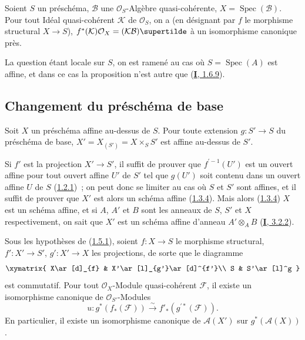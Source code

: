 \begin{proposition}[1.4.11]
\label{II.1.4.11-fr}
Soient $S$ un préschéma, $\mathcal{B}$ une $\mathcal{O}_S$-Algèbre
quasi-cohérente, $X=\operatorname{Spec}(\mathcal{B})$. Pour tout Idéal
quasi-cohérent $\mathcal{K}$ de $\mathcal{O}_S$, on a (en désignant par $f$
le morphisme structural $X\to S$),
$f^*(\mathcal{K})\mathcal{O}_X=(\mathcal{K}\mathcal{B})\supertilde$ à un
isomorphisme canonique près.
\end{proposition}

La question étant locale sur $S$, on est ramené au cas où
$S=\operatorname{Spec}(A)$ est affine, et dans ce cas la proposition n'est
autre que (\hyperref[I.1.6.9-fr]{\textbf{I}, 1.6.9}).

\subsection{Changement du préschéma de base}
\label{II.1.5-fr}

\begin{proposition}[1.5.1]
\label{II.1.5.1-fr}
Soit $X$ un préschéma affine au-dessus de $S$. Pour toute extension
$g:S'\to S$ du préschéma de base, $X'=X_{(S')}=X\times_S S'$ est affine
au-dessus de $S'$.
\end{proposition}

Si $f'$ est la projection $X'\to S'$, il suffit de prouver que
$f^{\prime-1}(U')$ est un ouvert affine pour tout ouvert affine $U'$ de $S'$
tel que $g(U')$ soit contenu dans un ouvert affine $U$ de $S$
(\hyperref[II.1.2.1-fr]{1.2.1})~; on peut donc se limiter au cas où $S$ et
$S'$ sont affines, et il suffit de prouver que $X'$ est alors un schéma
affine (\hyperref[II.1.3.4-fr]{1.3.4}). Mais alors
(\hyperref[II.1.3.4-fr]{1.3.4}) $X$ est un schéma affine, et si $A$, $A'$ et
$B$ sont les anneaux de $S$, $S'$ et $X$ respectivement, on sait que $X'$ est
un schéma affine d'anneau $A'\otimes_A B$
(\hyperref[I.3.2.2-fr]{\textbf{I}, 3.2.2}).

\begin{corollary}[1.5.2]
\label{II.1.5.2-fr}
Sous les hypothèses de \textup{(\hyperref[II.1.5.1-fr]{1.5.1})}, soient $f:X\to S$
le morphisme structural, $f':X'\to S'$, $g':X'\to X$ les projections, de
sorte que le diagramme
\[
  \xymatrix{
    X\ar[d]_{f} & X'\ar[l]_{g'}\ar[d]^{f'}\\
    S & S'\ar[l]^g
  }
\]
est commutatif. Pour tout $\mathcal{O}_X$-Module quasi-cohérent $\mathcal{F}$,
il existe un isomorphisme canonique de $\mathcal{O}_{S'}$-Modules
\[
  u:g^*(f_*(\mathcal{F}))\xrightarrow{\sim}
  f'_*(g^{\prime*}(\mathcal{F})).
  \tag{1.5.2.1}\label{II.1.5.2.1-fr}
\]
En particulier, il existe un isomorphisme canonique de $\mathcal{A}(X')$ sur
$g^*(\mathcal{A}(X))$.
\end{corollary}

